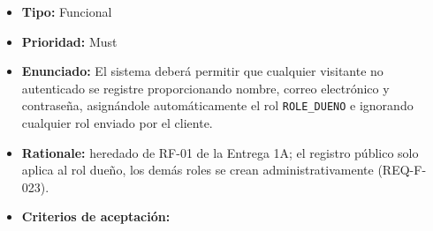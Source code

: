 \documentclass[
  spanish,
]{article}
\providecommand{\tightlist}{%
  \setlength{\itemsep}{0pt}\setlength{\parskip}{0pt}}
\begin{document}
\begin{itemize}
\tightlist
\item
  \textbf{Tipo:} Funcional
\item
  \textbf{Prioridad:} Must
\item
  \textbf{Enunciado:} El sistema deberá permitir que cualquier visitante
  no autenticado se registre proporcionando nombre, correo electrónico y
  contraseña, asignándole automáticamente el rol \texttt{ROLE\_\allowbreak{}DUENO} e
  ignorando cualquier rol enviado por el cliente.
\item
  \textbf{Rationale:} heredado de RF-01 de la Entrega 1A; el registro
  público solo aplica al rol dueño, los demás roles se crean
  administrativamente (REQ-F-023).
\item
  \textbf{Criterios de aceptación:}


\end{itemize}
\end{document}
